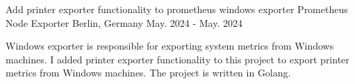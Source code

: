 


\begin{cventries}
    \cventry
    {Add printer exporter functionality to prometheus windows exporter} %
    {Prometheus Node Exporter} %
    {Berlin, Germany} %
    {May. 2024 - May. 2024} %
    { %
        \begin{cvitems}
            Windows exporter is responsible for exporting system metrics from Windows machines.
            I added printer exporter functionality to this project to export printer metrics from Windows machines.
            The project is written in Golang.
        \end{cvitems}
    }
\end{cventries}
